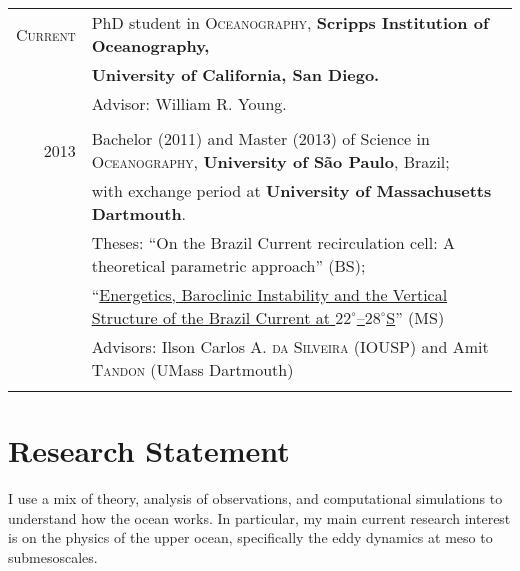 \documentclass[pagestart=firstchapter]{article}
\begin{document}
\begin{tabular}{rl}	

\textsc{Current}  & PhD student in \textsc{Oceanography}, \textbf{Scripps Institution of Oceanography,}\\
                  & \textbf{University of California, San Diego.}\\
                  & \small Advisor: William R. Young.\\
&\\
\textsc{2013} & Bachelor (2011) and Master (2013) of Science in \textsc{Oceanography}, \textbf{University of S\~ao Paulo}, Brazil;\\
                      &  with exchange period at \textbf{University of Massachusetts Dartmouth}.\\

                      & Theses: ``On the Brazil Current recirculation cell: A theoretical parametric approach'' (BS);\\
                      & ``\href{http://www.teses.usp.br/teses/disponiveis/21/21135/tde-26092013-185418/en.php}{Energetics, Baroclinic Instability and the Vertical Structure of the Brazil Current at $22^\circ$--$28^\circ$S}'' (MS) \\
& \small Advisors: Ilson Carlos A.  \textsc{da Silveira} (IOUSP) and Amit \textsc{Tandon} (UMass Dartmouth) \\
&\\

\end{tabular}



\section*{Research Statement}
I use a mix of theory, analysis of observations, and computational simulations to understand how the ocean works. In particular, my main current research interest is on the physics of the upper ocean, specifically the eddy dynamics at meso to submesoscales.
\end{document}
